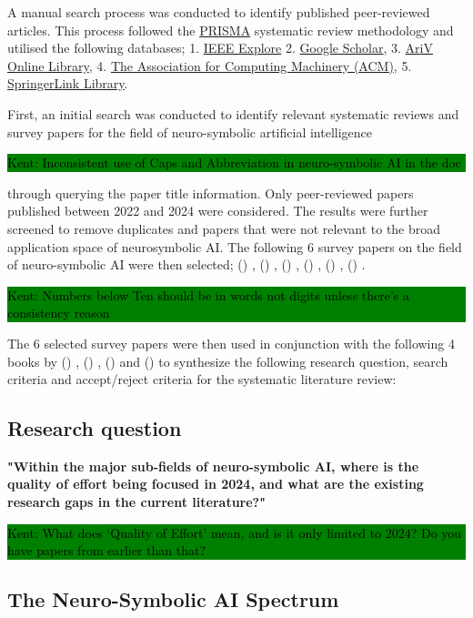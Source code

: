 \documentclass[hf]{ceurart}
\newcommand{\citeauthornum}[1]{\citeauthor{#1} (\citeyear{#1}) \cite{#1}}
\newcommand{\pinaforecomment}[4]{\colorbox{#1}{\textcolor{#4}{\parbox{.8\linewidth}{#2: #3}}}}
\newcommand{\osullikomment}[1]{\pinaforecomment{green}{Kent}{#1}{black}}
\begin{document}
A manual search process was conducted to identify published peer-reviewed articles. This process followed the \href{https://www.prisma-statement.org/}{PRISMA} systematic review methodology and utilised the following databases; 1. \href{https://ieeexplore.ieee.org/Xplore/home.jsp}{IEEE Explore} 2. \href{http://scholar.google.com}{Google Scholar}, 3. \href{https://arxiv.org/}{Ar\textnormal{\raisebox{0.5ex}{$\chi$}}iV Online Library}, 4. \href{http://portal.acm.org/portal.cfm}{The Association for Computing Machinery (ACM)}, 5. \href{http://www.springerlink.com}{SpringerLink Library}.

First, an initial search was conducted to identify relevant systematic reviews and survey papers for the field of neuro-symbolic artificial intelligence
%
\osullikomment{Inconsistent use of Caps and Abbreviation in neuro-symbolic AI in the doc}
%
through querying the paper title information. Only peer-reviewed papers published between 2022 and 2024 were considered. The results were further screened to remove duplicates and papers that were not relevant to the broad application space of neurosymbolic AI. The following 6 survey papers on the field of neuro-symbolic AI were then selected; \citeauthornum{Gibaut2023},  \citeauthornum{Yu2021}, \citeauthornum{Wan2024}, \citeauthornum{Marra2024}, \citeauthornum{MichelDeletie2024}, \citeauthornum{Bouneffouf2022}. 
%
\osullikomment{Numbers below Ten should be in words not digits unless there's a consistency reason}
%
The 6 selected survey papers were then used in conjunction with the following 4 books by \citeauthornum{Dingli2023}, \citeauthornum{Hitzler2023}, \citeauthornum{Hitzler2021} and \citeauthornum{Shakarian2023} to synthesize the following research question, search criteria and accept/reject criteria for the systematic literature review: 

\subsection{Research question}\label{subsec:research_quest}
\textbf{"Within the major sub-fields of neuro-symbolic AI, where is the quality of effort being focused in 2024, and what are the existing research gaps in the current literature?"}

\osullikomment{What does `Quality of Effort' mean, and is it only limited to 2024? Do you have papers from earlier than that?}

\subsection{The Neuro-Symbolic AI Spectrum}
\end{document}
